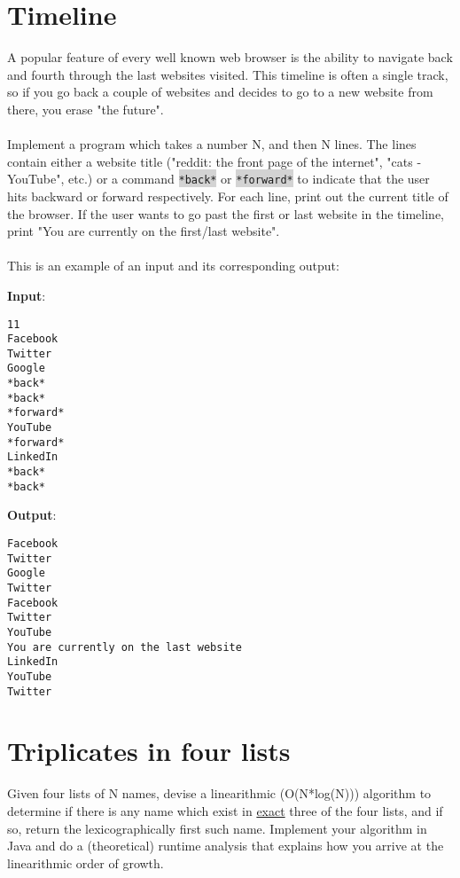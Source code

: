 \documentclass[11pt]{article}
\begin{document}
\section{Timeline}
A popular feature of every well known web browser is the ability to navigate back and fourth through the last websites visited. This timeline is often a single track, so if you go back a couple of websites and decides to go to a new website from there, you erase "the future".
    \\ \\
Implement a program which takes a number N, and then N lines.
The lines contain either a website title ("reddit: the front page of the internet", "cats - YouTube", etc.) or a command \colorbox{lightgray}{\lstinline{*back*}} or \colorbox{lightgray}{\lstinline{*forward*}} to indicate that the user hits backward or forward respectively.
For each line, print out the current title of the browser. If the user wants to go past the first or last website in the timeline, print "You are currently on the first/last website".
\\ \\
This is an example of an input and its corresponding output: \\

\noindent\begin{minipage}{.30\textwidth}
\textbf{Input}:
\begin{lstlisting}[frame=single]
11
Facebook
Twitter
Google
*back*
*back*
*forward*
YouTube
*forward*
LinkedIn
*back*
*back*
\end{lstlisting}
\end{minipage}\hfill
\noindent\begin{minipage}{.60\textwidth}
\textbf{Output}:
\\
\begin{lstlisting}[frame=single]
Facebook
Twitter
Google
Twitter
Facebook
Twitter
YouTube
You are currently on the last website
LinkedIn
YouTube
Twitter
\end{lstlisting}
\end{minipage}

\section{Triplicates in four lists}
Given four lists of N names, devise a linearithmic (O(N*log(N))) algorithm to determine if there is any name which exist in \underline{exact} three of the four lists, and if so, return the lexicographically first such name. Implement your algorithm in Java and do a (theoretical) runtime analysis that explains how you arrive at the linearithmic order of growth.
\end{document}
